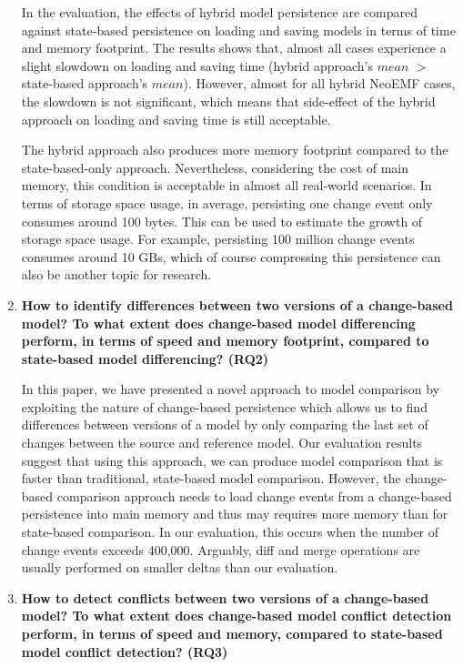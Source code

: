 \begin{enumerate}
  In the evaluation, the effects of hybrid model persistence are compared against state-based persistence on loading and saving models in terms of time and memory footprint. The results shows that, almost all cases experience a slight slowdown on loading and saving time (hybrid approach's $mean$ $>$ state-based approach's $mean$). However, almost for all hybrid NeoEMF cases, the slowdown is not significant, which means that side-effect of the hybrid approach on loading and saving time is still acceptable. 
  
  The hybrid approach also produces more memory footprint compared to the state-based-only approach. Nevertheless, considering the cost of main memory, this condition is acceptable in almost all real-world scenarios. In terms of storage space usage, in average, persisting one change event only consumes around 100 bytes. This can be used to estimate the growth of storage space usage. For example, persisting 100 million change events consumes around 10 GBs, which of course compressing this persistence can also be another topic for research.  
  
  \item \textbf{How to identify differences between two versions of a change-based model? To what extent does change-based model differencing perform, in terms of speed and memory footprint, compared to state-based model differencing? (RQ2)} 
  
  In this paper, we have presented a novel approach to model comparison by exploiting the nature of change-based persistence which allows us to find differences between versions of a model by only comparing the last set of changes between the source and reference model.
  Our evaluation results suggest that using this approach, we can produce model comparison that is faster than traditional, state-based model comparison.
  However, the change-based comparison approach needs to load change events from a change-based persistence into main memory and thus may requires more memory than for state-based comparison. In our evaluation, this occurs when the number of change events exceeds 400,000.
  Arguably, diff and merge operations are usually performed on smaller deltas than our evaluation.
  
  \item \textbf{How to detect conflicts between two versions of a change-based model? To what extent does change-based model conflict detection perform, in terms of speed and memory, compared to state-based model conflict detection? (RQ3)} 
\end{enumerate}

